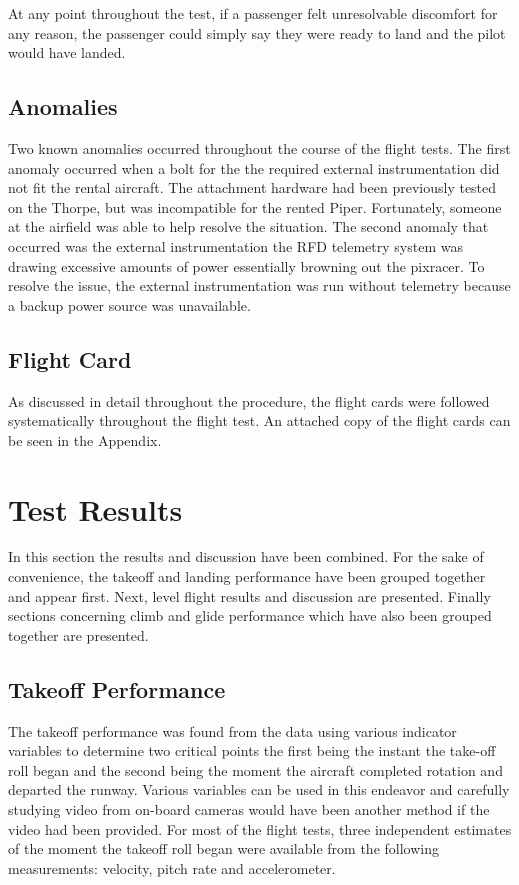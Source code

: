 \documentclass[conf]{new-aiaa}
\begin{document}
At any point throughout the test, if a passenger felt unresolvable discomfort for any reason, the passenger could simply say they were ready to land and the pilot would have landed. 

\subsection{Anomalies}

Two known anomalies occurred throughout the course of the flight tests. The first anomaly occurred when a bolt for the the required external instrumentation did not fit the rental aircraft. The attachment hardware had been previously tested on the Thorpe, but was incompatible for the rented Piper. Fortunately, someone at the airfield was able to help resolve the situation. The second anomaly that occurred was the  external instrumentation the RFD telemetry system was drawing excessive amounts of power essentially browning out the pixracer. To resolve the issue, the external instrumentation was run without telemetry because a backup power source was unavailable.   
\subsection{Flight Card}

As discussed in detail throughout the procedure, the flight cards were followed systematically throughout the flight test. An attached copy of the flight cards can be seen in the Appendix. 

\section{Test Results}

In this section the results and discussion have been combined. For the sake of convenience, the takeoff and landing performance have been grouped together and appear first. Next, level flight results and discussion are presented. Finally sections concerning climb and glide performance which have also been grouped together are presented.

\subsection{Takeoff Performance}

The takeoff performance was found from the data using various indicator variables to determine two critical points the first being the instant the take-off roll began and the second being the moment the aircraft completed rotation and departed the runway. Various variables can be used in this endeavor and carefully studying video from on-board cameras would have been another method if the video had been provided. For most of the flight tests, three independent estimates of the moment the takeoff roll began were available from the following measurements: velocity, pitch rate and accelerometer.
\end{document}
